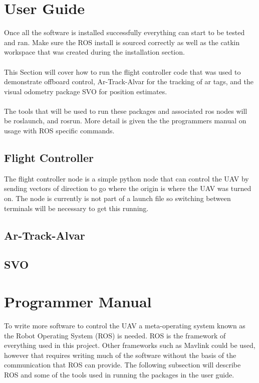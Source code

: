 \section{User Guide}
Once all the software is installed successfully everything can start to be tested and ran. Make sure the ROS install is sourced correctly as well as the catkin workspace that was created during the installation section.\\
\\
This Section will cover how to run the flight controller code that was used to demonstrate offboard control, Ar-Track-Alvar for the tracking of ar tags, and the visual odometry package SVO for position estimates.\\
\\
The tools that will be used to run these packages and associated ros nodes will be roslaunch, and rosrun. More detail is given the the programmers manual on usage with ROS specific commands. 
\subsection{Flight Controller}
The flight controller node is a simple python node that can control the UAV by sending vectors of direction to go where the origin is where the UAV was turned on. The node is currently is not part of a launch file so switching between terminals will be necessary to get this running.
\subsection{Ar-Track-Alvar}
\subsection{SVO}

\section{Programmer Manual}
To write more software to control the UAV a meta-operating system known as the Robot Operating System (ROS) is needed. ROS is the framework of everything used in this project. Other frameworks such as Mavlink could be used, however that requires writing much of the software without the basis of the communication that ROS can provide. The following subsection will describe ROS and some of the tools used in running the packages in the user guide.
